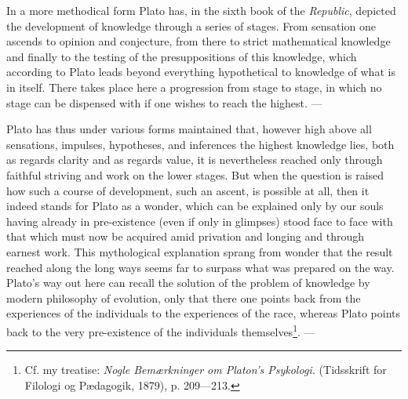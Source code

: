 \documentclass[12pt,a4paper,openany]{book}
\newcommand{\opage}[1]{\marginnote{\footnotesize\textit{[#1]}}}
\begin{document}
In a more methodical form Plato has, in the sixth book of the \textit{Republic},
depicted the development of knowledge through a series of stages.
From sensation one ascends to opinion and conjecture,
from there to strict mathematical knowledge and finally
to the testing of the presuppositions of this knowledge, which
according to Plato leads beyond everything hypothetical to knowledge of
what is in itself.  There takes place here a progression from
stage to stage, in which no stage can be dispensed with if one wishes to
reach the highest.  ---

Plato has thus under various forms maintained that,
however high above all sensations, impulses, hypotheses, and
inferences the highest knowledge lies, both as regards
clarity and as regards value, it is nevertheless reached only
\setcounter{footnote}{0}%
\opage{52}through faithful striving and work on the lower stages.
But when the question is raised how such a
course of development, such an ascent, is possible at all,
then it indeed stands for Plato as a wonder, which
can be explained only by our souls having already in pre-existence
(even if only in glimpses) stood face
to face with that which must now be acquired amid privation and
longing and through earnest work.  This mythological
explanation sprang from wonder that the
result reached along the long ways seems far to surpass
what was prepared on the way.  Plato's way out here can
recall the solution of the problem of knowledge by modern philosophy of evolution,
only that there one points back from the
experiences of the individuals to the experiences of the race, whereas
Plato points back to the very pre-existence of the individuals themselves\footnote[1]{Cf. my treatise: \textit{Nogle Bemærkninger om Platon’s Psykologi.} (Tidsskrift for Filologi og Pædagogik, 1879), p. 209---213.}.
---
\end{document}
